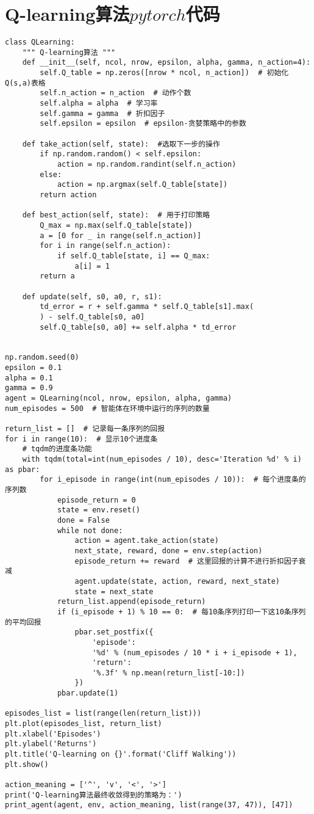 \section{Q-learning算法$pytorch$代码}
\begin{lstlisting}
class QLearning:
    """ Q-learning算法 """
    def __init__(self, ncol, nrow, epsilon, alpha, gamma, n_action=4):
        self.Q_table = np.zeros([nrow * ncol, n_action])  # 初始化Q(s,a)表格
        self.n_action = n_action  # 动作个数
        self.alpha = alpha  # 学习率
        self.gamma = gamma  # 折扣因子
        self.epsilon = epsilon  # epsilon-贪婪策略中的参数

    def take_action(self, state):  #选取下一步的操作
        if np.random.random() < self.epsilon:
            action = np.random.randint(self.n_action)
        else:
            action = np.argmax(self.Q_table[state])
        return action

    def best_action(self, state):  # 用于打印策略
        Q_max = np.max(self.Q_table[state])
        a = [0 for _ in range(self.n_action)]
        for i in range(self.n_action):
            if self.Q_table[state, i] == Q_max:
                a[i] = 1
        return a

    def update(self, s0, a0, r, s1):
        td_error = r + self.gamma * self.Q_table[s1].max(
        ) - self.Q_table[s0, a0]
        self.Q_table[s0, a0] += self.alpha * td_error


np.random.seed(0)
epsilon = 0.1
alpha = 0.1
gamma = 0.9
agent = QLearning(ncol, nrow, epsilon, alpha, gamma)
num_episodes = 500  # 智能体在环境中运行的序列的数量

return_list = []  # 记录每一条序列的回报
for i in range(10):  # 显示10个进度条
    # tqdm的进度条功能
    with tqdm(total=int(num_episodes / 10), desc='Iteration %d' % i) as pbar:
        for i_episode in range(int(num_episodes / 10)):  # 每个进度条的序列数
            episode_return = 0
            state = env.reset()
            done = False
            while not done:
                action = agent.take_action(state)
                next_state, reward, done = env.step(action)
                episode_return += reward  # 这里回报的计算不进行折扣因子衰减
                agent.update(state, action, reward, next_state)
                state = next_state
            return_list.append(episode_return)
            if (i_episode + 1) % 10 == 0:  # 每10条序列打印一下这10条序列的平均回报
                pbar.set_postfix({
                    'episode':
                    '%d' % (num_episodes / 10 * i + i_episode + 1),
                    'return':
                    '%.3f' % np.mean(return_list[-10:])
                })
            pbar.update(1)

episodes_list = list(range(len(return_list)))
plt.plot(episodes_list, return_list)
plt.xlabel('Episodes')
plt.ylabel('Returns')
plt.title('Q-learning on {}'.format('Cliff Walking'))
plt.show()

action_meaning = ['^', 'v', '<', '>']
print('Q-learning算法最终收敛得到的策略为：')
print_agent(agent, env, action_meaning, list(range(37, 47)), [47])
\end{lstlisting}

